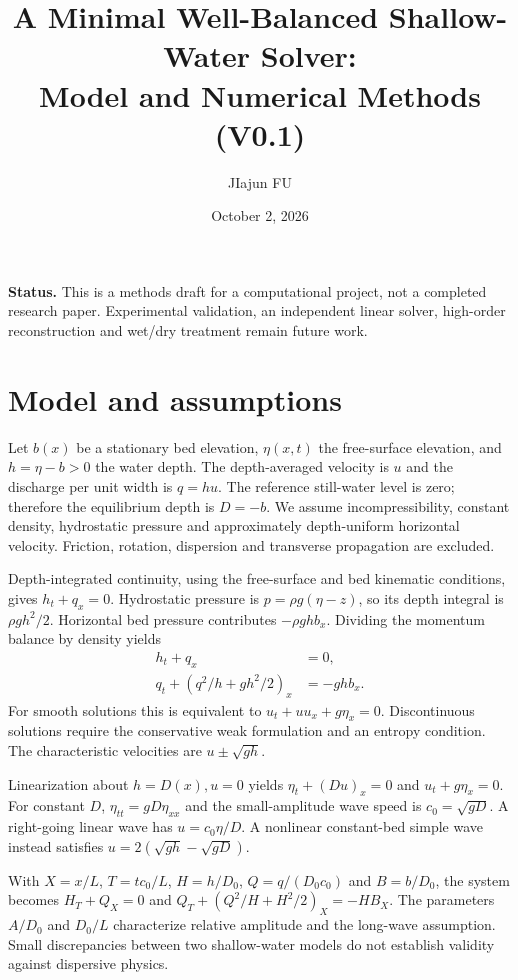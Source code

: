 \documentclass[11pt]{article}
\title{A Minimal Well-Balanced Shallow-Water Solver:\\Model and Numerical Methods (V0.1)}
\author{JIajun FU}
\date{October 2, 2026}
\begin{document}
\maketitle
\noindent\textbf{Status.} This is a methods draft for a computational project, not a completed research paper. Experimental validation, an independent linear solver, high-order reconstruction and wet/dry treatment remain future work.

\section{Model and assumptions}
Let $b(x)$ be a stationary bed elevation, $\eta(x,t)$ the free-surface elevation, and $h=\eta-b>0$ the water depth. The depth-averaged velocity is $u$ and the discharge per unit width is $q=hu$. The reference still-water level is zero; therefore the equilibrium depth is $D=-b$. We assume incompressibility, constant density, hydrostatic pressure and approximately depth-uniform horizontal velocity. Friction, rotation, dispersion and transverse propagation are excluded.

Depth-integrated continuity, using the free-surface and bed kinematic conditions, gives $h_t+q_x=0$. Hydrostatic pressure is $p=\rho g(\eta-z)$, so its depth integral is $\rho gh^2/2$. Horizontal bed pressure contributes $-\rho ghb_x$. Dividing the momentum balance by density yields
\begin{align}
h_t+q_x&=0,\\
q_t+\left(q^2/h+gh^2/2\right)_x&=-ghb_x.
\end{align}
For smooth solutions this is equivalent to $u_t+uu_x+g\eta_x=0$. Discontinuous solutions require the conservative weak formulation and an entropy condition. The characteristic velocities are $u\pm\sqrt{gh}$.

Linearization about $h=D(x),u=0$ yields $\eta_t+(Du)_x=0$ and $u_t+g\eta_x=0$. For constant $D$, $\eta_{tt}=gD\eta_{xx}$ and the small-amplitude wave speed is $c_0=\sqrt{gD}$. A right-going linear wave has $u=c_0\eta/D$. A nonlinear constant-bed simple wave instead satisfies $u=2(\sqrt{gh}-\sqrt{gD})$.

With $X=x/L$, $T=tc_0/L$, $H=h/D_0$, $Q=q/(D_0c_0)$ and $B=b/D_0$, the system becomes $H_T+Q_X=0$ and $Q_T+(Q^2/H+H^2/2)_X=-HB_X$. The parameters $A/D_0$ and $D_0/L$ characterize relative amplitude and the long-wave assumption. Small discrepancies between two shallow-water models do not establish validity against dispersive physics.
\end{document}
